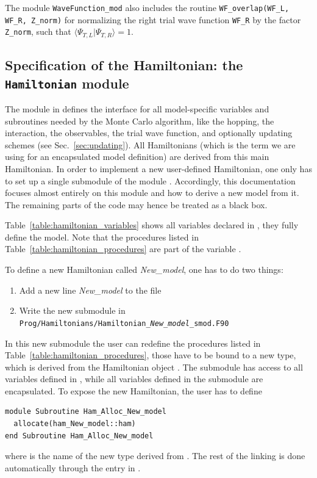 The module \texttt{WaveFunction\_mod} also includes the routine \texttt{WF\_overlap(WF\_L, WF\_R, Z\_norm)} for normalizing the right trial wave function \texttt{WF\_R} by the factor \texttt{Z\_norm}, such that $\langle \Psi_{T,L} | \Psi_{T,R} \rangle = 1$.


\subsection{Specification of the Hamiltonian: the \texttt{Hamiltonian} module} 
\label{sec:hamiltonian}



The module  in  defines the interface for all model-specific variables and subroutines needed by the Monte Carlo algorithm, like the hopping,  the interaction, the observables, the trial wave function, and optionally updating schemes (see Sec.~\ref{sec:updating}).
All Hamiltonians (which is the term we are using for an encapsulated model definition) are derived from this main Hamiltonian.
In order to implement a new user-defined Hamiltonian, one only has to set up a single submodule of the module . Accordingly, this documentation focuses almost entirely on this module and how to derive a new model from it.
The remaining parts of the code may hence be treated as a black box.

Table~\ref{table:hamiltonian_variables} shows all variables declared in , they fully define the model. Note that the procedures listed in Table~\ref{table:hamiltonian_procedures} are part of the variable .

To define a new Hamiltonian called \emph{New\_model}, one has to do two things:
\begin{enumerate}
\item Add a new line \emph{New\_model} to the file 
\item Write the new submodule in \texttt{Prog/Hamiltonians/Hamiltonian\_\emph{New\_model}\_smod.F90}
\end{enumerate}

In this new submodule the user can redefine the procedures listed in Table~\ref{table:hamiltonian_procedures}, those have to be bound to a new type, which is derived from the Hamiltonian object . The submodule has access to all variables defined in , while all variables defined in the submodule are encapsulated. To expose the new Hamiltonian, the user has to define 
\begin{lstlisting}[style=fortran]
module Subroutine Ham_Alloc_New_model
  allocate(ham_New_model::ham)
end Subroutine Ham_Alloc_New_model
\end{lstlisting}
where  is the name of the new type derived from . The rest of the linking is done automatically through the entry in .

